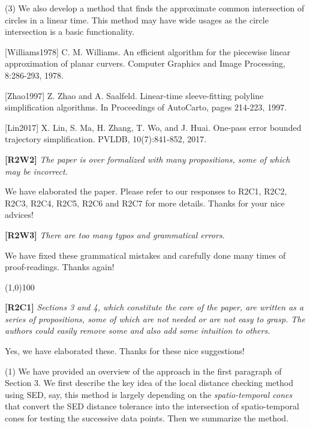 \documentclass{letter}
\begin{document}
(3) We also develop a method that finds the approximate common intersection of circles in a linear time. This method may have wide usages as the circle intersection is a basic functionality.

[Williams1978] C. M. Williams. An efficient algorithm for the piecewise linear approximation of planar curvers. Computer Graphics and Image Processing, 8:286-293, 1978.

[Zhao1997]  Z. Zhao and A. Saalfeld. Linear-time sleeve-fitting polyline simplification algorithms. In Proceedings of AutoCarto, pages 214-223, 1997.

[Lin2017] X. Lin, S. Ma, H. Zhang, T. Wo, and J. Huai. One-pass error bounded trajectory simplification. PVLDB, 10(7):841-852, 2017.

\textbf{[R2W2]} \emph{The paper is over formalized with many propositions, some of which may be incorrect.}

We have elaborated the paper. Please refer to our responses to R2C1, R2C2, R2C3, R2C4, R2C5, R2C6 and R2C7 for more details. Thanks for your nice advices!

\textbf{[R2W3]} \emph{There are too many typos and grammatical errors.}

We have fixed these grammatical mistakes and carefully done many times of proof-readings. Thanks again!

\line(1,0){100}

\textbf{[R2C1]} \emph{Sections 3 and 4, which constitute the core of the paper, are written as a series of propositions, some of which are not needed or are not easy to grasp. The authors could easily remove some and also add some intuition to others.}

Yes, we have elaborated these. Thanks for these nice suggestions!

(1) We have provided an overview of the approach in the first paragraph of Section 3. We first describe the key idea of the local distance checking method using SED, say, this method is largely depending on the \emph{spatio-temporal cones} that convert the SED distance tolerance into the intersection of spatio-temporal cones for testing the successive data points. Then we summarize the method. 
\end{document}
